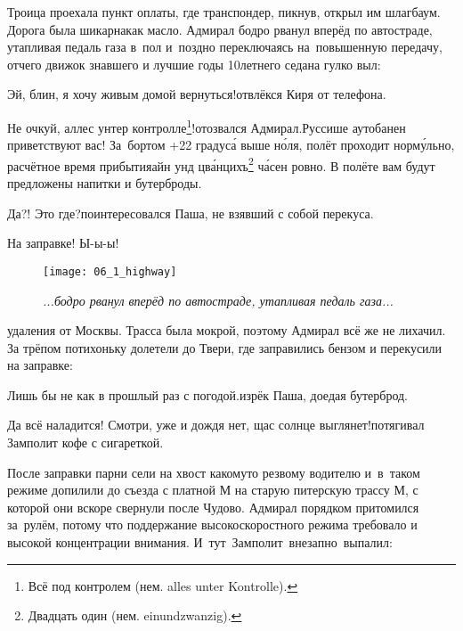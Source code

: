 Троица проехала пункт оплаты, где транспондер, пикнув, открыл им шлагбаум. Дорога была шикарна\mdash как масло. Адмирал бодро рванул вперёд по автостраде, утапливая педаль газа в~пол и~поздно переключаясь на~повышенную передачу, отчего движок знавшего и лучшие годы 10\sdash летнего седана гулко выл:

\diagdash Эй, блин, я хочу живым домой вернуться!\mdash отвлёкся Киря от телефона.

\setcounter{footnote}{0}
\renewcommand*{\thefootnote}{\arabic{footnote}}

\diagdash Не очкуй, аллес унтер контролле\footnote{Всё под контролем (нем. alles unter Kontrolle).}!\mdash отозвался Адмирал.\mdash Руссише аутобанен приветствуют вас! За~бортом +22 градус\'{а} выше н\'{о}ля, полёт проходит норм\'{у}льно, расчётное время прибытия\mdash айн унд цв\'{а}нцихъ\footnote{Двадцать один (нем. einundzwanzig).} ч\'{а}сен ровно. В полёте вам будут предложены напитки и бутерброды.

\diagdash Да?! Это где?\mdash поинтересовался Паша, не взявший с собой перекуса.

\diagdash На заправке! Ы-ы-ы!

\makebox[\linewidth-\parindent][s]{Дождь помаленьку прекращался по мере их}

\newpage

{
\setlength{\belowcaptionskip}{-5mm}
\begin{figure}[h]
	\centering
	\texttt{[image: 06\_1\_highway]}
	\caption{\small\textit{...бодро рванул вперёд по автостраде, утапливая педаль газа...}}
\end{figure}

\noindent удаления от Москвы. Трасса была мокрой, поэтому Адмирал всё же не лихачил. За трёпом потихоньку долетели до Твери, где заправились бензом и перекусили на заправке:
}

\diagdash Лишь бы не как в прошлый раз с погодой.\mdash изрёк Паша, доедая бутерброд.

\diagdash Да всё наладится! Смотри, уже и дождя нет, щас солнце выглянет!\mdash потягивал Замполит кофе с сигареткой.

После заправки парни сели на хвост какому\sdash то резвому водителю и~в~таком режиме допилили до съезда с платной М на старую питерскую трассу М, с которой они вскоре свернули после Чудово. Адмирал порядком притомился за~рулём, потому что поддержание высокоскоростного режима требовало и высокой концентрации внимания. И~тут~Замполит~внезапно~выпалил:

